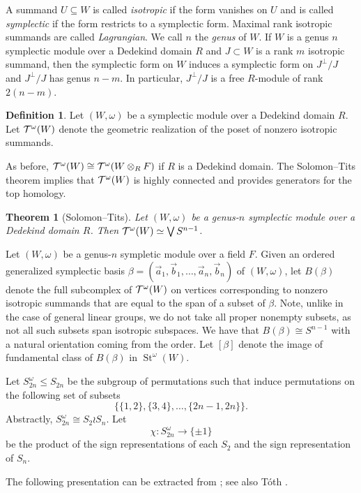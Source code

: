 \documentclass[11pt,letterpaper]{amsart}
\numberwithin{theoremcounter}{section}
\newtheorem{theorem}[theoremauto]{Theorem}
\theoremstyle{definition}
\newtheorem{definition}[Defauto]{Definition}
\theoremstyle{remark}
\DeclareMathOperator{\St}{St}
\begin{document}
A summand $U \subseteq W$ is called \emph{isotropic} if the form vanishes on $U$ and is called \emph{symplectic} if the form restricts to a symplectic form. Maximal rank isotropic summands are called \emph{Lagrangian}. We call $n$ the \emph{genus} of $W$. If $W$ is a genus $n$ symplectic module over a Dedekind domain $R$ and $J \subset W$ is a rank $m$ isotropic summand, then the symplectic form on $W$ induces a symplectic form on $J^\perp/J$ and $J^\perp/J$ has genus $n-m$. In particular, $J^\perp/J$ is a free $R$-module of rank $2(n-m)$.

\begin{definition}
    Let $(W,\omega)$ be a symplectic module over a Dedekind domain $R$. Let $\mathcal{T}^\omega(W)$ denote the geometric realization of the poset of nonzero isotropic summands. 
\end{definition}

As before, $\mathcal{T}^\omega(W) \cong \mathcal{T}^\omega(W \otimes_R F)$ if $R$ is a Dedekind domain. The Solomon--Tits theorem implies that $\mathcal{T}^\omega(W)$ is highly connected and provides generators for the top homology.

\begin{theorem}[Solomon--Tits]
Let $(W,\omega)$ be a genus-$n$ symplectic module over a Dedekind domain $R$. Then    $\mathcal{T}^\omega(W) \simeq \bigvee S^{n-1}$.
\end{theorem}

Let $(W,\omega)$ be a genus-$n$ sympletic module over a field $F$. Given an ordered generalized symplectic basis $\beta=(\vec a_1,\vec b_1,\ldots,\vec a_n,\vec b_n)$ of $(W,\omega)$, let $B(\beta)$ denote the full subcomplex of $\mathcal{T}^\omega(W)$ on vertices corresponding to nonzero isotropic summands that are equal to the span of a subset of $\beta$. Note, unlike in the case of general linear groups, we do not take all proper nonempty subsets, as not all such subsets span isotropic subspaces. We have that $B(\beta) \cong S^{n-1}$ with a natural orientation coming from the order. Let $[\beta]$ denote the image of fundamental class of $B(\beta)$ in $\St^\omega(W)$.  


Let $S_{2n}^\omega \leq S_{2n}$ be the subgroup of permutations such that induce permutations on the following set of subsets $$\{\{1,2 \},\{3,4 \},\dots,\{2n-1,2n \} \}.$$ Abstractly,  $S_{2n}^\omega \cong S_2 \wr S_n$. Let $$\chi\colon S_{2n}^\omega \to \{\pm 1\}  $$ be the product of the sign representations of each $S_2$ and the sign representation of $S_n$.

The following presentation can be extracted from \cite[Corollary 1.4, Lemma 4.3, Proof of Theorem 1.5]{Pal}; see also T\'oth \cite[Theorem 2]{Toth}. 
\end{document}
